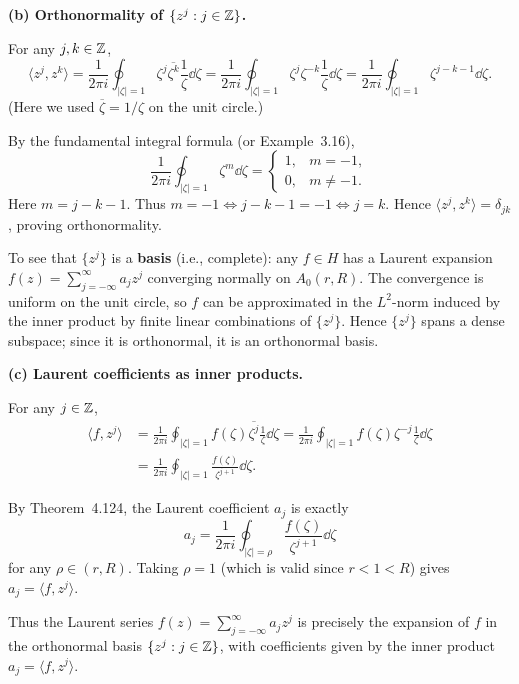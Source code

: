 \documentclass{article}
\begin{document}
\begin{solution}
  \medskip
  \textbf{(b) Orthonormality of $\{z^j : j \in \mathbb{Z}\}$.}

  For any $j, k \in \mathbb{Z}$,
  \[
    \langle z^j, z^k \rangle
    = \frac{1}{2\pi i} \oint_{|\zeta|=1} \zeta^j \overline{\zeta^k}
    \frac{1}{\zeta} \dd\zeta
    = \frac{1}{2\pi i} \oint_{|\zeta|=1} \zeta^j \zeta^{-k}
    \frac{1}{\zeta} \dd\zeta
    = \frac{1}{2\pi i} \oint_{|\zeta|=1} \zeta^{j-k-1} \dd\zeta.
  \]
  (Here we used $\overline{\zeta} = 1/\zeta$ on the unit circle.)

  By the fundamental integral formula (or Example~3.16),
  \[
    \frac{1}{2\pi i} \oint_{|\zeta|=1} \zeta^{m} \dd\zeta
    = \begin{cases}
      1, & m = -1,\\
      0, & m \ne -1.
    \end{cases}
  \]
  Here $m = j-k-1$. Thus $m = -1 \iff j-k-1 = -1 \iff j = k$.
  Hence $\langle z^j, z^k \rangle = \delta_{jk}$, proving orthonormality.

  To see that $\{z^j\}$ is a \textbf{basis} (i.e., complete): any
  $f \in H$ has a Laurent expansion $f(z) = \sum_{j=-\infty}^{\infty} a_j z^j$
  converging normally on $A_0(r, R)$. The convergence is uniform on the unit
  circle, so $f$ can be approximated in the $L^2$-norm induced by the inner
  product by finite linear combinations of $\{z^j\}$. Hence $\{z^j\}$ spans
  a dense subspace; since it is orthonormal, it is an orthonormal basis.

  \medskip
  \textbf{(c) Laurent coefficients as inner products.}

  For any $j \in \mathbb{Z}$,
  \begin{align*}
    \langle f, z^j \rangle
    &= \frac{1}{2\pi i} \oint_{|\zeta|=1} f(\zeta) \overline{\zeta^j}
    \frac{1}{\zeta} \dd\zeta
    = \frac{1}{2\pi i} \oint_{|\zeta|=1} f(\zeta) \zeta^{-j}
    \frac{1}{\zeta} \dd\zeta\\
    &= \frac{1}{2\pi i} \oint_{|\zeta|=1}
    \frac{f(\zeta)}{\zeta^{j+1}} \dd\zeta.
  \end{align*}

  By Theorem~4.124, the Laurent coefficient $a_j$ is exactly
  \[
    a_j = \frac{1}{2\pi i} \oint_{|\zeta|=\rho}
    \frac{f(\zeta)}{\zeta^{j+1}} \dd\zeta
  \]
  for any $\rho \in (r, R)$. Taking $\rho = 1$ (which is valid since
  $r < 1 < R$) gives $a_j = \langle f, z^j \rangle$.

  Thus the Laurent series $f(z) = \sum_{j=-\infty}^{\infty} a_j z^j$ is
  precisely the expansion of $f$ in the orthonormal basis $\{z^j : j \in \mathbb{Z}\}$,
  with coefficients given by the inner product $a_j = \langle f, z^j \rangle$.
\end{solution}
\end{document}

